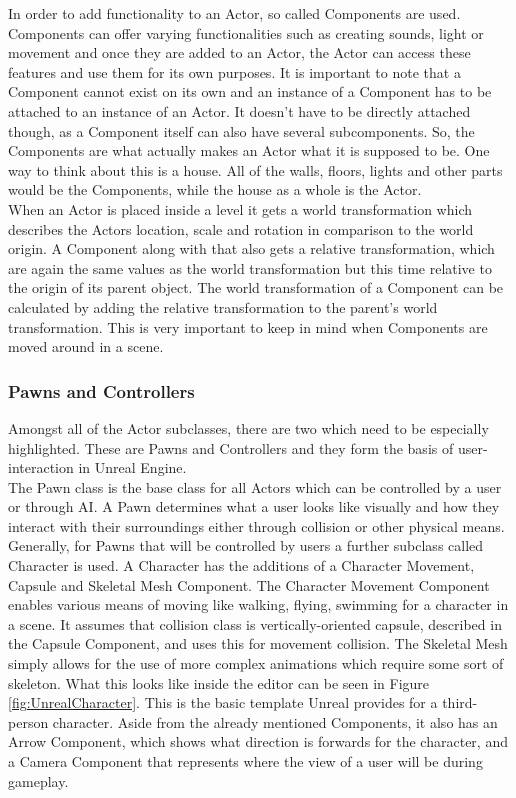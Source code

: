 In order to add functionality to an Actor, so called Components are used\cite{bib:UEComponents}. Components can offer varying functionalities such as creating sounds, light or movement and once they are added to an Actor, the Actor can access these features and use them for its own purposes. It is important to note that a Component cannot exist on its own and an instance of a Component has to be attached to an instance of an Actor. It doesn't have to be directly attached though, as a Component itself can also have several subcomponents. So, the Components are what actually makes an Actor what it is supposed to be. One way to think about this is a house. All of the walls, floors, lights and other parts would be the Components, while the house as a whole is the Actor.\\

When an Actor is placed inside a level it gets a world transformation which describes the Actors location, scale and rotation in comparison to the world origin. A Component along with that also gets a relative transformation, which are again the same values as the world transformation but this time relative to the origin of its parent object. The world transformation of a Component can be calculated by adding the relative transformation to the parent's world transformation. This is very important to keep in mind when Components are moved around in a scene. 

\subsubsection{Pawns and Controllers}
Amongst all of the Actor subclasses, there are two which need to be especially highlighted. These are Pawns and Controllers and they form the basis of user-interaction in Unreal Engine.\\
The Pawn class is the base class for all Actors which can be controlled by a user or through \acs{AI}\cite{bib:UEPawn}. A Pawn determines what a user looks like visually and how they interact with their surroundings either through collision or other physical means. Generally, for Pawns that will be controlled by users a further subclass called Character is used\cite{bib:UECharacter}. A Character has the additions of a Character Movement, Capsule and Skeletal Mesh Component. The Character Movement Component enables various means of moving like walking, flying, swimming for a character in a scene. It assumes that collision class is vertically-oriented capsule, described in the Capsule Component, and uses this for movement collision. The Skeletal Mesh simply allows for the use of more complex animations which require some sort of skeleton. What this looks like inside the editor can be seen in Figure \ref{fig:UnrealCharacter}. This is the basic template Unreal provides for a third-person character. Aside from the already mentioned Components, it also has an Arrow Component, which shows what direction is forwards for the character, and a Camera Component that represents where the view of a user will be during gameplay.\\

